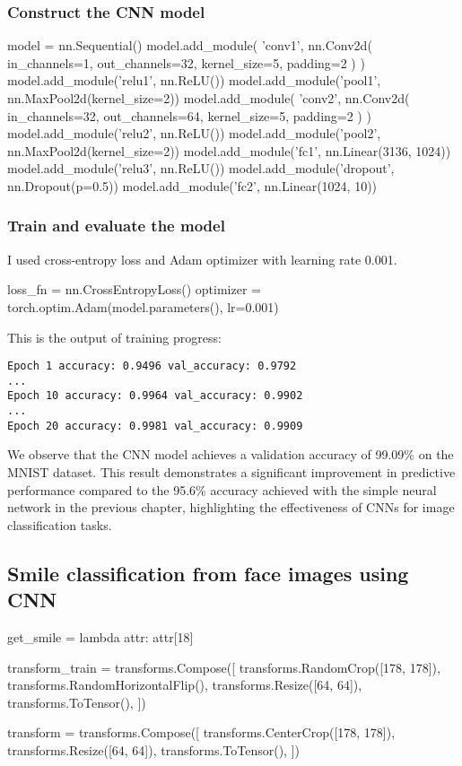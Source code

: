 \subsubsection{Construct the CNN model}
\begin{pythoncode}
model = nn.Sequential()
model.add_module(
    'conv1',
    nn.Conv2d(
        in_channels=1, out_channels=32, kernel_size=5, padding=2
    )
)
model.add_module('relu1', nn.ReLU())
model.add_module('pool1', nn.MaxPool2d(kernel_size=2))
model.add_module(
    'conv2',
    nn.Conv2d(
        in_channels=32, out_channels=64, kernel_size=5, padding=2
    )
)
model.add_module('relu2', nn.ReLU())
model.add_module('pool2', nn.MaxPool2d(kernel_size=2))
model.add_module('fc1', nn.Linear(3136, 1024))
model.add_module('relu3', nn.ReLU())
model.add_module('dropout', nn.Dropout(p=0.5))
model.add_module('fc2', nn.Linear(1024, 10))
\end{pythoncode}

\subsubsection{Train and evaluate the model}
I used cross-entropy loss and Adam optimizer with learning rate 0.001.
\begin{pythoncode}
loss_fn = nn.CrossEntropyLoss()
optimizer = torch.optim.Adam(model.parameters(), lr=0.001)
\end{pythoncode}

This is the output of training progress:
\begin{verbatim}
Epoch 1 accuracy: 0.9496 val_accuracy: 0.9792
...
Epoch 10 accuracy: 0.9964 val_accuracy: 0.9902
...
Epoch 20 accuracy: 0.9981 val_accuracy: 0.9909
\end{verbatim}
We observe that the CNN model achieves a validation accuracy of 99.09\% on the MNIST dataset. This result demonstrates a significant improvement in predictive performance compared to the 95.6\% accuracy achieved with the simple neural network in the previous chapter, highlighting the effectiveness of CNNs for image classification tasks.

\subsection{Smile classification from face images using CNN}
\begin{pythoncode}
get_smile = lambda attr: attr[18]

transform_train = transforms.Compose([
    transforms.RandomCrop([178, 178]),
    transforms.RandomHorizontalFlip(),
    transforms.Resize([64, 64]),
    transforms.ToTensor(),
])

transform = transforms.Compose([
    transforms.CenterCrop([178, 178]),
    transforms.Resize([64, 64]),
    transforms.ToTensor(),
])
\end{pythoncode}


